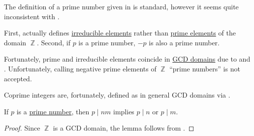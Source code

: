 \begin{remark}\label{rem:prime_numbers}
  The definition of a prime number given in  is standard, however it seems quite inconsistent with .

  First,  actually defines \hyperref[def:domain_divisibility/irreducible]{irreducible elements} rather than \hyperref[def:domain_divisibility/prime]{prime elements} of the domain \( \BbbZ \). Second, if \( p \) is a prime number, \( -p \) is also a prime number.

  Fortunately, prime and irreducible elements coincide in \hyperref[def:gcd_domain]{GCD domains} due to  and . Unfortunately, calling negative prime elements of \( \BbbZ \) \enquote{prime numbers} is not accepted.

  Coprime integers are, fortunately, defined as in general GCD domains via .
\end{remark}

\begin{lemma}\label{thm:euclids_lemma}
  If \( p \) is a \hyperref[def:prime_number]{prime number}, then \( p \mid nm \) implies \( p \mid n \) or \( p \mid m \).
\end{lemma}
\begin{proof}
  Since \( \BbbZ \) is a GCD domain, the lemma follows from .
\end{proof}

